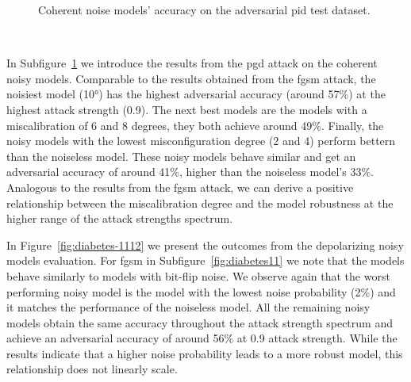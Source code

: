 \begin{figure}[!h]
\begin{subfigure}{0.45\textwidth}
      \label{fig:diabetes10}
  \end{subfigure}
  \caption{Coherent noise models' accuracy on the adversarial \ac{pid} test dataset.}
  \label{fig:diabetes-910}
\end{figure} \

In Subfigure~\ref{fig:diabetes10} we introduce the results from the \ac{pgd}
attack on the coherent noisy models. Comparable to the results obtained
from the \ac{fgsm} attack, the noisiest model (10°) has the highest adversarial
accuracy (around 57\%) at the highest attack strength (0.9). The next best
models are the models with a miscalibration of 6 and 8 degrees, they both
achieve around 49\%. Finally, the noisy models with the lowest misconfiguration
degree (2 and 4) perform bettern than the noiseless model. These noisy models
behave similar and get an adversarial accuracy of around 41\%, higher than
the noiseless model's 33\%. Analogous to the results from the \ac{fgsm}
attack, we can derive a positive relationship between the miscalibration
degree and the model robustness at the higher range of the attack strengths
spectrum.  \

In Figure~\ref{fig:diabetes-1112} we present the outcomes from the depolarizing
noisy models evaluation. For \ac{fgsm} in Subfigure~\ref{fig:diabetes11}
we note that the models behave similarly to models with bit-flip noise.
We observe again that the worst performing noisy model is the model with
the lowest noise probability (2\%) and it matches the performance of the
noiseless model. All the remaining noisy models obtain the same accuracy
throughout the attack strength spectrum and achieve an adversarial
accuracy of around 56\% at 0.9 attack strength. While the results indicate
that a higher noise probability leads to a more robust model, this
relationship does not linearly scale. \

